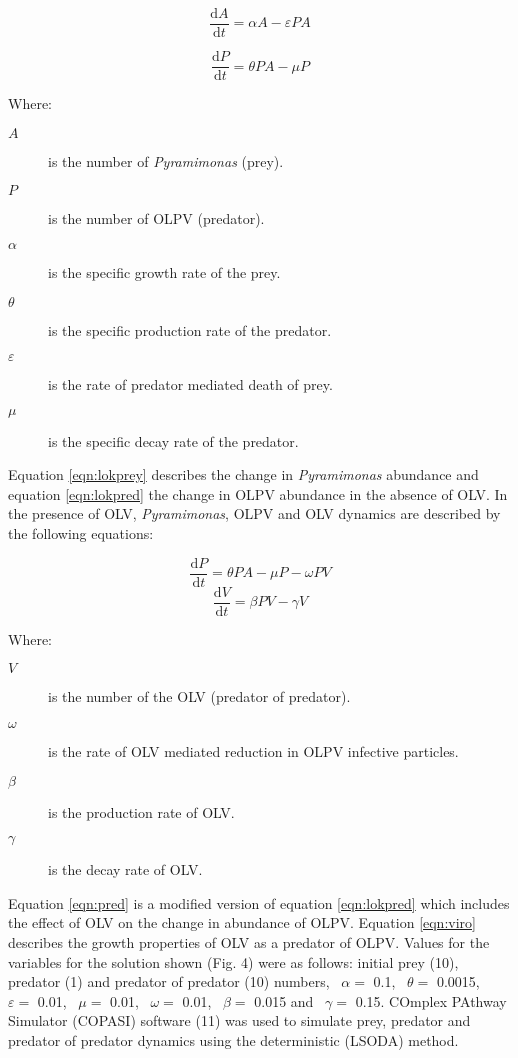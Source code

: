 \begin{equation}
\frac{\mathrm{d}A}{\mathrm{d}t}=\alpha A - \varepsilon PA
\label{eqn:lokprey}
\end{equation}

\begin{equation}
\frac{\mathrm{d}P}{\mathrm{d}t}= \theta PA - \mu P
\label{eqn:lokpred}
\end{equation}

Where:
\begin{description}
\item[$A$] is the number of \emph{Pyramimonas} (prey).
\item[$P$] is the number of \ac{OLPV} (predator).
\item[$\alpha$] is the specific growth rate of the prey.
\item[$\theta$] is the specific production rate of the predator.
\item[$\varepsilon$] is the rate of predator mediated death of prey.
\item[$\mu$] is the specific decay rate of the predator.
\end{description}

Equation \ref{eqn:lokprey} describes the change in \emph{Pyramimonas} abundance and equation \ref{eqn:lokpred} the change in \ac{OLPV} abundance in the absence of \ac{OLV}.
In the presence of \ac{OLV}, \emph{Pyramimonas}, \ac{OLPV} and \ac{OLV} dynamics are described by the following equations:

\begin{equation}
\frac{\mathrm{d}P}{\mathrm{d}t}= \theta PA - \mu P - \omega PV
\label{eqn:pred}
\end{equation}
\begin{equation}
\frac{\mathrm{d}V}{\mathrm{d}t}=\beta PV - \gamma V
\label{eqn:viro}
\end{equation}

Where:
\begin{description}
\item[$V$] is the number of the \ac{OLV} (predator of predator).
\item[$\omega$] is the rate of \ac{OLV} mediated reduction in OLPV infective particles.
\item[$\beta$] is the production rate of \ac{OLV}.
\item[$\gamma$] is the decay rate of \ac{OLV}.
\end{description}

Equation \ref{eqn:pred} is a modified version of equation \ref{eqn:lokpred} which includes the effect of \ac{OLV} on the change in abundance of \ac{OLPV}.
Equation \ref{eqn:viro} describes the growth properties of \ac{OLV} as a predator of \ac{OLPV}.
Values for the variables for the solution shown (Fig. 4) were as follows: initial prey (10), predator (1) and predator of predator (10) numbers, ~$\alpha=$ 0.1, ~$\theta=$ 0.0015, ~$\varepsilon=$ 0.01, ~$\mu=$ 0.01, ~$\omega=$ 0.01, ~$\beta=$ 0.015 and ~$\gamma=$ 0.15. 
COmplex PAthway Simulator (\textsc{COPASI}) software (11) was used to simulate prey, predator and predator of predator dynamics using the deterministic (\textsc{LSODA}) method.


